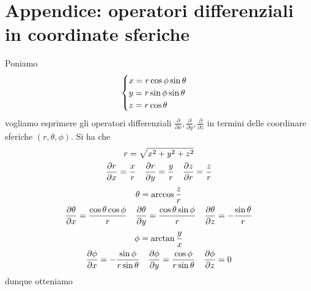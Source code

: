 \documentclass{article}
\begin{document}
\section*{Appendice: operatori differenziali in coordinate sferiche}
Poniamo
\begin{gather}
    \begin{cases}
        x = r\cos \phi \sin \theta \\
        y = r\sin \phi \sin \theta \\
        z = r\cos \theta \notag
    \end{cases}
\end{gather}
vogliamo esprimere gli operatori differenziali $\frac{\partial}{\partial x}, \frac{\partial}{\partial y}, \frac{\partial}{\partial z}$ in termini delle coordinare sferiche $(r, \theta, \phi)$. Si ha che
\begin{gather}
    r = \sqrt{x^2 + y^2 + z^2} \notag \\
    \frac{\partial r}{\partial x} = \frac{x}{r} \quad \frac{\partial r}{\partial y} = \frac{y}{r} \quad \frac{\partial z}{\partial r} = \frac{z}{r} \notag
\end{gather}
\begin{gather}
    \theta = \arccos \frac{z}{r} \notag \\
    \frac{\partial \theta}{\partial x} = \frac{\cos \theta \cos \phi}{r} \quad \frac{\partial \theta}{\partial y} = \frac{\cos \theta \sin \phi}{r} \quad \frac{\partial \theta}{\partial z} = -\frac{\sin\theta}{r} \notag
\end{gather}
\begin{gather}
    \phi = \arctan \frac{y}{x} \notag \\
    \frac{\partial \phi}{\partial x} = -\frac{\sin \phi}{r\sin \theta} \quad \frac{\partial \phi}{\partial y} = \frac{\cos \phi}{r\sin\theta} \quad \frac{\partial \phi}{\partial z} = 0 \notag
\end{gather}
dunque otteniamo
\end{document}
